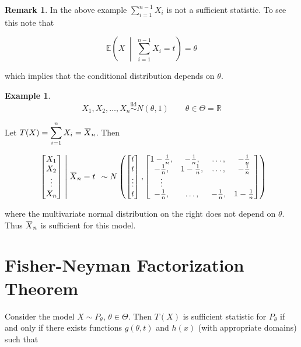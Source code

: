 \documentclass[12pt]{article}
\newcommand{\overbar}[1]{\mkern 1.5mu\overline{\mkern-1.5mu#1\mkern-1.5mu}\mkern 1.5mu}
\theoremstyle{definition}
\newtheorem*{example}{Example}
\newtheorem*{remark}{Remark}
\begin{document}
\begin{remark}
In the above example $\sum_{i = 1}^{n-1} X_i$ is not a sufficient statistic. To
see this note that

$$ \mathbb{E}\left(X \; \middle|\;  \sum_{i =1}^{n-1} X_i = t \right) = \theta$$

which implies that the conditional distribution depends on $\theta$.
\end{remark}

\begin{example}
$$X_1, X_2, \ldots, X_n \overset{\text{iid}}{\sim} N(\theta, 1) \quad\quad \theta \in \Theta = \mathbb{R}$$
\end{example}

Let $\displaystyle T(X) = \sum_{i = 1}^n X_i = \overbar{X}_n$. Then

\begin{align*}
\left.\
\begin{bmatrix}
X_1 \\
X_2 \\
\vdots \\
X_n
\end{bmatrix} 
\;\middle|\;
\overbar{X}_n = t
\right.\
\sim
N \left(
\begin{bmatrix}
t \\
t \\
\vdots \\
t
\end{bmatrix},
\begin{bmatrix}
1 - \frac{1}{n}, & -\frac{1}{n}, & \ldots, & -\frac{1}{n} \\
-\frac{1}{n}, & 1 - \frac{1}{n}, & \ldots, & -\frac{1}{n} \\
\vdots & & & \\
-\frac{1}{n}, & \ldots, & -\frac{1}{n}, & 1 - \frac{1}{n}
\end{bmatrix}
\right)
\end{align*}

where the multivariate normal distribution on the right does not
depend on $\theta$. Thus $\overbar{X}_n$ is sufficient for this
model.



\section{Fisher-Neyman Factorization Theorem}

Consider the model $X \sim P_{\theta}$, $\theta \in \Theta$. Then $T(X)$
is sufficient statistic for $P_{\theta}$ if and only if there exists
functions $g(\theta, t)$ and $h(x)$ (with appropriate domains) such that
\end{document}
